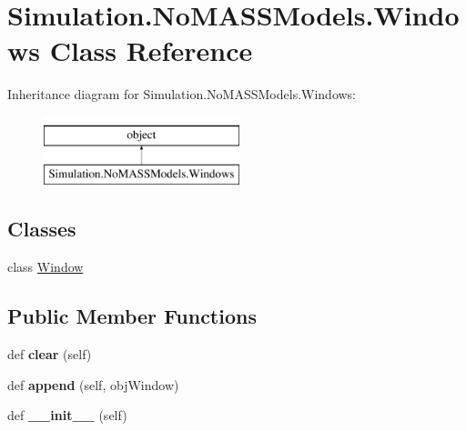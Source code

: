 \hypertarget{class_c_simulation_1_1_simulation_1_1_no_m_a_s_s_models_1_1_windows}{}\section{Simulation.\+No\+M\+A\+S\+S\+Models.\+Windows Class Reference}
\label{class_c_simulation_1_1_simulation_1_1_no_m_a_s_s_models_1_1_windows}
Inheritance diagram for Simulation.\+No\+M\+A\+S\+S\+Models.\+Windows\+:\begin{figure}[H]
\begin{center}
\leavevmode
\includegraphics[height=2.000000cm]{class_c_simulation_1_1_simulation_1_1_no_m_a_s_s_models_1_1_windows}
\end{center}
\end{figure}
\subsection*{Classes}
\begin{DoxyCompactItemize}
\item 
class \hyperlink{class_c_simulation_1_1_simulation_1_1_no_m_a_s_s_models_1_1_windows_1_1_window}{Window}
\end{DoxyCompactItemize}
\subsection*{Public Member Functions}
\begin{DoxyCompactItemize}
\item 
\mbox{\label{class_c_simulation_1_1_simulation_1_1_no_m_a_s_s_models_1_1_windows_ad149341d7d849ff957baee565b19c123}} 
def {\bfseries clear} (self)
\item 
\mbox{\label{class_c_simulation_1_1_simulation_1_1_no_m_a_s_s_models_1_1_windows_aa2a4917738c5103d4c810980e7e1b755}} 
def {\bfseries append} (self, obj\+Window)
\item 
\mbox{\label{class_c_simulation_1_1_simulation_1_1_no_m_a_s_s_models_1_1_windows_ae64f0875afe3067b97ba370b354b9213}} 
def {\bfseries \+\_\+\+\_\+init\+\_\+\+\_\+} (self)
\end{DoxyCompactItemize}
